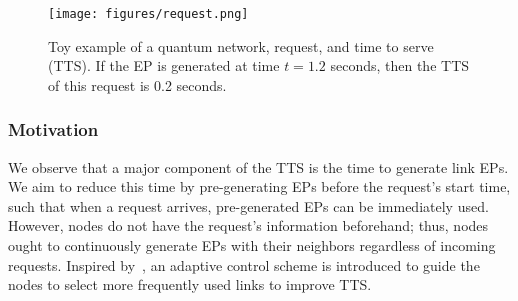 \begin{figure}
    \centering
    \texttt{[image: figures/request.png]}
    \vspace{-0.1in}
    \caption{Toy example of a quantum network, request, and time to serve (TTS).
    If the EP is generated at time $t = 1.2$ seconds, then the TTS of this request is 0.2 seconds.}
    \vspace{-0.1in}
    \label{fig:request}
\end{figure}

\subsubsection{Motivation} 
We observe that a major component of the TTS is the time to generate link EPs. 
We aim to reduce this time by pre-generating EPs before the request's start time,
such that when a request arrives, pre-generated EPs can be immediately used.
However, nodes do not have the request's information beforehand; thus, nodes ought to continuously generate EPs with their neighbors regardless of incoming requests.
Inspired by~\cite{kolar-ac-infocom22}, an adaptive control scheme is introduced to guide the nodes to select more frequently used links to improve TTS.


